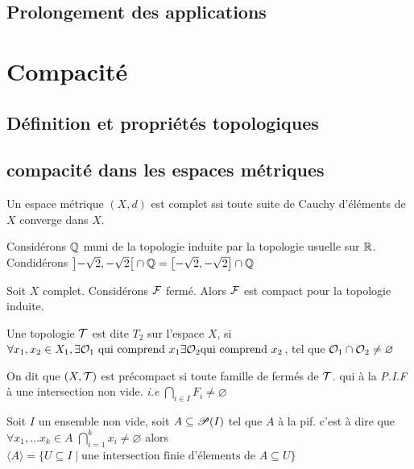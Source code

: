 \subsection{Prolongement des applications}

\section{Compacité}
\subsection{Définition et propriétés topologiques}

\subsection{compacité dans les espaces métriques}
 \begin{definition}
      Un espace métrique $(X,d)$ est complet ssi toute suite de Cauchy d'éléments de $X$ converge dans $X$.
  \end{definition}
  \begin{remarque}
      Considérons $\mathbb{Q}$ muni de la topologie induite par la topologie usuelle sur $\mathbb{R}$. Condidérons $\left] -\sqrt 2, -\sqrt 2\right[\cap \mathbb{Q} = \left[ -\sqrt 2, -\sqrt 2\right]\cap \mathbb{Q} $
  \end{remarque}
  Soit $X$ complet. Considérons $\mathcal{F}$ fermé. Alors $\mathcal{F}$ est compact pour la topologie induite.

 \begin{definition}
     Une topologie $\mathcal{T}$ est dite $T_2$ sur l'espace $X$, si $\forall x_1,x_2 \in X_1, \exists \mathcal{O}_1 \text{ qui comprend }x_1 \exists \mathcal{O}_2 \text{qui comprend }x_2 $, tel que $\mathcal{O}_1\cap\mathcal{O}_2\neq \varnothing$  
 \end{definition}
\begin{definition}
    On dit que $(X,\mathcal{T})$ est précompact si toute famille de fermés de $\mathcal{T}$. qui à la \textit{P.I.F} à une intersection non vide. \textit{i.e} $\bigcap_{i\in I}F_i\neq \varnothing$
\end{definition}

\begin{exercice}
    Soit $I$ un ensemble non vide, soit $A\subseteq \mathscr{P} (I)$ tel que $A$ à la pif. c'est à dire que $\forall x_1,\dotsc x_k\in A$ $\bigcap_{i=1}^kx_i\neq \varnothing$ alors $\langle A\rangle  = \{U\subseteq I \mid \text{une intersection finie d'élements de }A \subseteq U\}$
\end{exercice}


